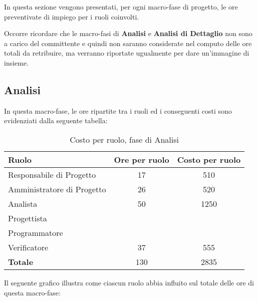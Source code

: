 In questa sezione vengono presentati, per ogni macro-fase di progetto, le ore preventivate di impiego per i ruoli coinvolti.

\noindent Occorre ricordare che le macro-fasi di \textbf{Analisi} e \textbf{Analisi di Dettaglio} non sono a carico del committente e quindi non saranno considerate nel computo delle ore totali da retribuire, ma verranno riportate ugualmente per dare un'immagine di insieme.

\subsection{Analisi}
In questa macro-fase, le ore ripartite tra i ruoli ed i conseguenti costi sono evidenziati dalla seguente tabella:

\begin{table}[h]
	\centering
	\begin{tabular}{|l|c|c|}
		\toprule
		\textbf{Ruolo} & \textbf{Ore per ruolo} & \textbf{Costo per ruolo} \\
				
		\midrule
		Responsabile di Progetto & 17 & 510 \\
		Amministratore di Progetto & 26 & 520 \\ 
		Analista & 50 & 1250 \\
		Progettista & & \\
		Programmatore & & \\
		Verificatore & 37 & 555 \\
		\midrule
		\textbf{Totale} & 130 & 2835 \\
				
		\bottomrule
	\end{tabular}
	\caption{Costo per ruolo, fase di Analisi}
\end{table}

\noindent Il seguente grafico illustra come ciascun ruolo abbia influito sul totale delle ore di questa macro-fase:

